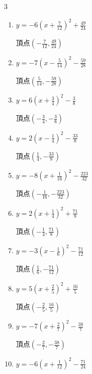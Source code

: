 \begin{multicols}{3}
\begin{enumerate}
        $\displaystyle 頂点\left( \frac{7}{16} , -\frac{239}{32} \right)$

  \item $\displaystyle y=-6\left( x+\frac{7}{12}\right)^{2}+\frac{49}{24}$

        $\displaystyle 頂点\left( -\frac{7}{12} , \frac{49}{24} \right)$

  \item $\displaystyle y=-7\left( x-\frac{5}{14}\right)^{2}-\frac{59}{28}$

        $\displaystyle 頂点\left( \frac{5}{14} , -\frac{59}{28} \right)$

  \item $\displaystyle y=6\left( x+\frac{3}{4}\right)^{2}-\frac{3}{8}$

        $\displaystyle 頂点\left( -\frac{3}{4} , -\frac{3}{8} \right)$

  \item $\displaystyle y=2\left( x-\frac{1}{4}\right)^{2}-\frac{33}{8}$

        $\displaystyle 頂点\left( \frac{1}{4} , -\frac{33}{8} \right)$

  \item $\displaystyle y=-8\left( x+\frac{1}{16}\right)^{2}-\frac{223}{32}$

        $\displaystyle 頂点\left( -\frac{1}{16} , -\frac{223}{32} \right)$

  \item $\displaystyle y=2\left( x+\frac{1}{4}\right)^{2}+\frac{71}{8}$

        $\displaystyle 頂点\left( -\frac{1}{4} , \frac{71}{8} \right)$

  \item $\displaystyle y=-3\left( x-\frac{1}{6}\right)^{2}-\frac{71}{12}$

        $\displaystyle 頂点\left( \frac{1}{6} , -\frac{71}{12} \right)$

  \item $\displaystyle y=5\left( x+\frac{2}{5}\right)^{2}+\frac{16}{5}$

        $\displaystyle 頂点\left( -\frac{2}{5} , \frac{16}{5} \right)$

\columnbreak %

  \item $\displaystyle y=-7\left( x+\frac{2}{7}\right)^{2}-\frac{38}{7}$

        $\displaystyle 頂点\left( -\frac{2}{7} , -\frac{38}{7} \right)$

  \item $\displaystyle y=-6\left( x+\frac{1}{12}\right)^{2}-\frac{71}{24}$


\end{enumerate}
\end{multicols}

